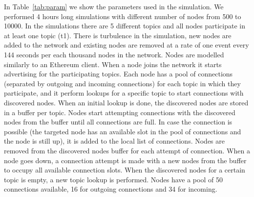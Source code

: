 In Table~\ref{tab:param} we show the parameters used in the simulation. 
We performed 4 hours long simulations with different number of nodes from 500 to 10000.
In the simulations there are 5 different topics and all nodes participate in at least one topic (t1).
There is turbulence in the simulation,  \ie new nodes are added to the network and existing nodes are removed at a rate of one event every 144 seconds per each thousand nodes in the network.
Nodes are modelled similarly to an Ethereum client. 
When a node joins the network it starts advertising for the participating topics.
Each node has a pool of connections (separated by outgoing and incoming connections) for each topic in which they participate, and it perform lookups
for a specific topic to start connections with discovered nodes.
When an initial lookup is done,  the discovered nodes are stored in a buffer per topic.
Nodes start attempting connections with the discovered nodes from the buffer until all connections  are full.
In case the connection is possible (the targeted node has an available slot in the pool of connections and the node is still up), it is added 
to the local list of connections.
Nodes are removed from the discovered nodes buffer for each attempt of connection.
When a node goes down, a connection attempt is made with a new nodes from the buffer to occupy all available connection slots.
When the discovered nodes for a certain topic is empty, a new topic lookup is performed.
Nodes have a pool of 50 connections available, 16 for outgoing connections and 34 for incoming.
